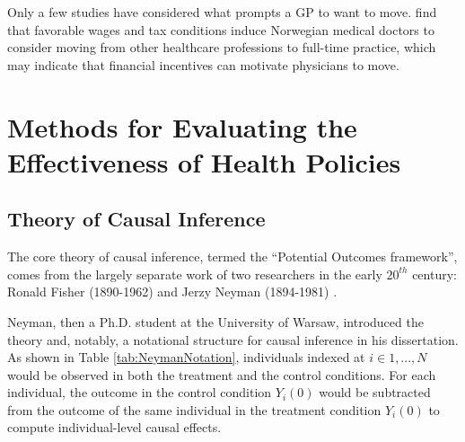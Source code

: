 \documentclass[12pt]{article}
\begin{document}
Only a few studies have considered what prompts a GP to want to move. \citep{andreassenMedicalDoctorsRespond2013} find that favorable wages and tax conditions induce Norwegian medical doctors to consider moving from other healthcare professions to full-time practice, which may indicate that financial incentives can motivate physicians to move.




\section{Methods for Evaluating the Effectiveness of Health Policies}

\subsection{Theory of Causal Inference}

The core theory of causal inference, termed the ``Potential Outcomes framework'', comes from the largely separate work of two researchers in the early $20^{th}$ century: Ronald Fisher (1890-1962) and Jerzy Neyman (1894-1981) \citep{rubinCausalInferenceUsing2005}.

Neyman, then a Ph.D. student at the University of Warsaw, introduced the theory and, notably, a notational structure for causal inference in his dissertation. As shown in Table \ref{tab:NeymanNotation}, individuals indexed at $i \in {1, ..., N}$ would be observed in both the treatment and the control conditions. For each individual, the outcome in the control condition $Y_i(0)$ would be subtracted from the outcome of the same individual in the treatment condition  $Y_i(0)$ to compute individual-level causal effects.
\end{document}
